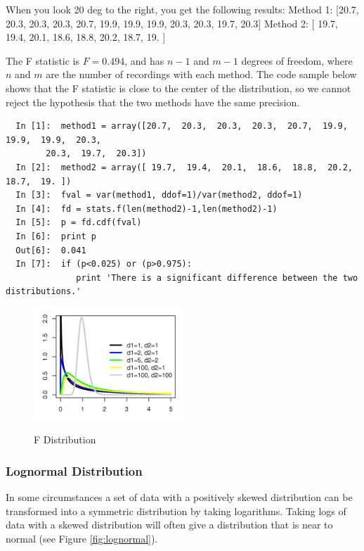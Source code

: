 When you look 20 deg to the right, you get the following results:
Method 1: [20.7,  20.3,  20.3,  20.3,  20.7,  19.9,  19.9,  19.9,  20.3,
        20.3,  19.7,  20.3]
Method 2: [ 19.7,  19.4,  20.1,  18.6,  18.8,  20.2,  18.7,  19. ]

The F statistic is $F = 0.494$, and has $n-1$ and $m-1$ degrees of freedom, where $n$ and $m$ are the number of recordings with each method. The code sample below shows that the F statistic is close to the center of the distribution, so we cannot reject the hypothesis that the two methods have the same precision.

\begin{lstlisting}
  In [1]:  method1 = array([20.7,  20.3,  20.3,  20.3,  20.7,  19.9,  19.9,  19.9,  20.3,
        20.3,  19.7,  20.3])
  In [2]:  method2 = array([ 19.7,  19.4,  20.1,  18.6,  18.8,  20.2,  18.7,  19. ])
  In [3]:  fval = var(method1, ddof=1)/var(method2, ddof=1)
  In [4]:  fd = stats.f(len(method2)-1,len(method2)-1)
  In [5]:  p = fd.cdf(fval)
  In [6]:  print p
  Out[6]:  0.041
  In [7]:  if (p<0.025) or (p>0.975):
              print 'There is a significant difference between the two distributions.'
\end{lstlisting}

\begin{figure}
  \centering
  \includegraphics[width=0.5\textwidth]{../Images/F_distributionPDF.png}\\
  \caption{F Distribution}
\end{figure}


\subsubsection{Lognormal Distribution}

In some circumstances a set of data with a positively skewed distribution can be transformed into a symmetric distribution by taking logarithms. Taking logs of data with a skewed distribution will often give a distribution that is near to normal (see Figure \ref{fig:lognormal}).

